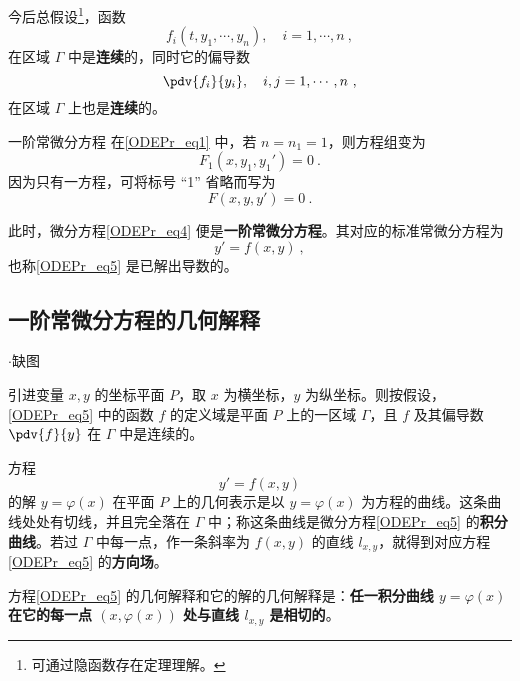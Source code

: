 今后总假设\footnote{可通过隐函数存在定理理解。}，函数 
\begin{equation}
f_i(t,y_1,\cdots,y_n),\quad i=1,\cdots,n~,
\end{equation}
在区域 $\Gamma$ 中是\textbf{连续}的，同时它的偏导数
\begin{equation}
\pdv{f_i}{y_i},\quad i,j=1,\cdots,n~,
\end{equation}
在区域 $\Gamma$ 上也是\textbf{连续}的。
\begin{example}{一阶常微分方程}
在\autoref{ODEPr_eq1} 中，若 $n=n_1=1$，则方程组变为
\begin{equation}\label{ODEPr_eq3}
F_1(x,y_1,y_1')=0~.
\end{equation}
因为只有一方程，可将标号 “1” 省略而写为
\begin{equation}\label{ODEPr_eq4}
F(x,y,y')=0~.
\end{equation}

此时，微分方程\autoref{ODEPr_eq4} 便是\textbf{一阶常微分方程}。其对应的标准常微分方程为
\begin{equation}\label{ODEPr_eq5}
y'=f(x,y)~,
\end{equation}
也称\autoref{ODEPr_eq5} 是已解出导数的。
\end{example}
\subsection{一阶常微分方程的几何解释}
\begin{issues}
$\cdot$缺图
\end{issues}

引进变量 $x,y$ 的坐标平面 $P$，取 $x$ 为横坐标，$y$ 为纵坐标。则按假设，\autoref{ODEPr_eq5} 中的函数 $f$ 的定义域是平面 $P$ 上的一区域 $\Gamma$，且 $f$ 及其偏导数 $\pdv{f}{y}$ 在 $\Gamma$ 中是连续的。

方程
\begin{equation}
y'=f(x,y)
\end{equation}
的解 $y=\varphi(x)$ 在平面 $P$ 上的几何表示是以 $y=\varphi(x)$ 为方程的曲线。这条曲线处处有切线，并且完全落在 $\Gamma$ 中；称这条曲线是微分方程\autoref{ODEPr_eq5} 的\textbf{积分曲线}。若过 $\Gamma$ 中每一点，作一条斜率为 $f(x,y)$ 的直线 $l_{x,y}$，就得到对应方程\autoref{ODEPr_eq5} 的\textbf{方向场}。

方程\autoref{ODEPr_eq5} 的几何解释和它的解的几何解释是：\textbf{任一积分曲线 $y=\varphi(x)$ 在它的每一点 $(x,\varphi(x))$ 处与直线 $l_{x,y}$ 是相切的}。